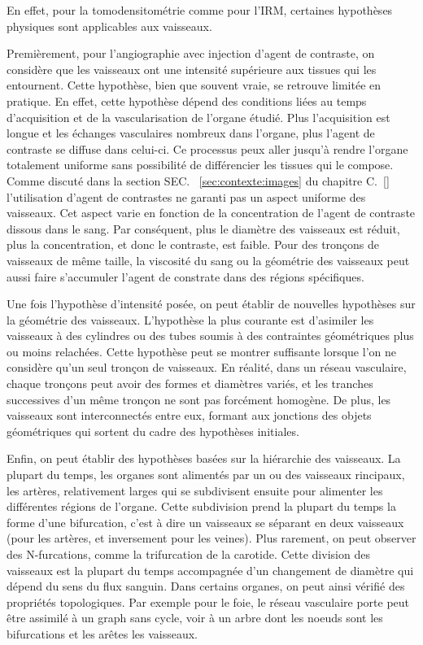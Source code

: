 {En effet, pour la tomodensitométrie comme pour l'IRM, certaines hypothèses physiques sont applicables aux vaisseaux.

Premièrement, pour l'angiographie avec injection d'agent de contraste, on considère que les vaisseaux ont une intensité supérieure aux tissues qui les entournent. Cette hypothèse, bien que souvent vraie, se retrouve limitée en pratique. En effet, cette hypothèse dépend des conditions liées au temps d'acquisition et de la vascularisation de l'organe étudié. Plus l'acquisition est longue et les échanges vasculaires nombreux dans l'organe, plus l'agent de contraste se diffuse dans celui-ci. Ce processus peux aller jusqu'à rendre l'organe totalement uniforme sans possibilité de différencier les tissues qui le compose. Comme discuté dans la section SEC. ~\ref{sec:contexte:images} du chapitre C.~\ref{} l'utilisation d'agent de contrastes ne garanti pas un aspect uniforme des vaisseaux. Cet aspect varie en fonction de la concentration de l'agent de contraste dissous dans le sang. Par conséquent, plus le diamètre des vaisseaux est réduit, plus la concentration, et donc le contraste, est faible. Pour des tronçons de vaisseaux de même taille, la viscosité du sang ou la géométrie des vaisseaux peut aussi faire s'accumuler l'agent de constrate dans des régions spécifiques.

Une fois l'hypothèse d'intensité posée, on peut établir de nouvelles hypothèses sur la géométrie des vaisseaux. L'hypothèse la plus courante est d'asimiler les vaisseaux à des cylindres ou des tubes soumis à des contraintes géométriques plus ou moins relachées. Cette hypothèse peut se montrer suffisante lorsque l'on ne considère qu'un seul tronçon de vaisseaux. En réalité, dans un réseau vasculaire, chaque tronçons peut avoir des formes et diamètres variés, et les tranches successives d'un même tronçon ne sont pas forcément homogène. De plus, les vaisseaux sont interconnectés entre eux, formant aux jonctions des objets géométriques qui sortent du cadre des hypothèses initiales.

Enfin, on peut établir des hypothèses basées sur la hiérarchie des vaisseaux. La plupart du temps, les organes sont alimentés par un ou des vaisseaux rincipaux, les artères, relativement larges qui se subdivisent ensuite pour alimenter les différentes régions de l'organe. Cette subdivision prend la plupart du temps la forme d'une bifurcation, c'est à dire un vaisseaux se séparant en deux vaisseaux (pour les artères, et inversement pour les veines). Plus rarement, on peut observer des N-furcations, comme la trifurcation de la carotide. Cette division des vaisseaux est la plupart du temps accompagnée d'un changement de diamètre qui dépend du sens du flux sanguin. Dans certains organes, on peut ainsi vérifié des propriétés topologiques. Par exemple pour le foie, le réseau vasculaire porte peut être assimilé à un graph sans cycle, voir à un arbre dont les noeuds sont les bifurcations et les arêtes les vaisseaux.

}
